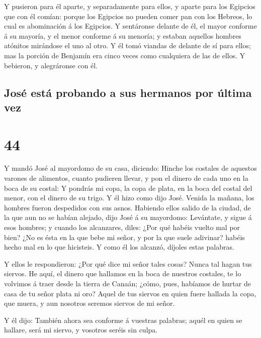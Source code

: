  Y pusieron para él aparte, y separadamente para ellos, y
aparte para los Egipcios que con él comían: porque los Egipcios no
pueden comer pan con los Hebreos, lo cual es abominación á los Egipcios.
 Y sentáronse delante de él, el mayor conforme á su
mayoría, y el menor conforme á su menoría; y estaban aquellos hombres
atónitos mirándose el uno al otro.  Y él tomó viandas de
delante de sí para ellos; mas la porción de Benjamín era cinco veces
como cualquiera de las de ellos. Y bebieron, y alegráronse con él.

\hypertarget{josuxe9-estuxe1-probando-a-sus-hermanos-por-uxfaltima-vez}{%
\subsection{José está probando a sus hermanos por última
vez}\label{josuxe9-estuxe1-probando-a-sus-hermanos-por-uxfaltima-vez}}

\hypertarget{section-01-44}{%
\section{44}\label{section-01-44}}

 Y mandó José al mayordomo de su casa, diciendo: Hinche
los costales de aquestos varones de alimentos, cuanto pudieren llevar, y
pon el dinero de cada uno en la boca de su costal:  Y
pondrás mi copa, la copa de plata, en la boca del costal del menor, con
el dinero de su trigo. Y él hizo como dijo José.  Venida
la mañana, los hombres fueron despedidos con sus asnos. 
Habiendo ellos salido de la ciudad, de la que aun no se habían alejado,
dijo José á su mayordomo: Levántate, y sigue á esos hombres; y cuando
los alcanzares, diles: ¿Por qué habéis vuelto mal por bien?
 ¿No es ésta en la que bebe mi señor, y por la que suele
adivinar? habéis hecho mal en lo que hicisteis.  Y como él
los alcanzó, díjoles estas palabras.

 Y ellos le respondieron: ¿Por qué dice mi señor tales
cosas? Nunca tal hagan tus siervos.  He aquí, el dinero
que hallamos en la boca de nuestros costales, te lo volvimos á traer
desde la tierra de Canaán; ¿cómo, pues, habíamos de hurtar de casa de tu
señor plata ni oro?  Aquel de tus siervos en quien fuere
hallada la copa, que muera, y aun nosotros seremos siervos de mi señor.

 Y él dijo: También ahora sea conforme á vuestras
palabras; aquél en quien se hallare, será mi siervo, y vosotros seréis
sin culpa.

